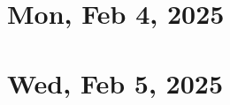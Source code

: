 \documentclass[a4paper]{report}
\institute{Institute Name}
\date{Based on lectures by \profloc{} in 2023
\\~\\ Draft updated on \today}
\begin{document}
\renewcommand\thepage{Title}
\maketitle
\renewcommand\thepage{Preface} 

\newpage
\pagestyle{plain}
\setcounter{tocdepth}{0}
\tableofcontents
\newpage
\pagestyle{head}

\chapter{Mon, Feb 4, 2025}

\chapter{Wed, Feb 5, 2025}



\end{document}
